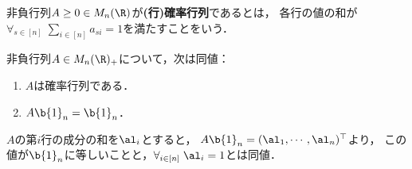 \documentclass[uplatex, dvipdfmx]{jsreport}
\begin{document}
\begin{definition}
    非負行列$A\ge0\in M_n(\R)$が\textbf{(行)確率行列}であるとは，
    各行の値の和が$\forall_{s\in[n]}\;\sum_{i\in[n]}a_{si}=1$を満たすことをいう．
\end{definition}

\begin{lemma}[行確率行列の特徴付け]
    非負行列$A\in M_n(\R)_+$について，次は同値：
    \begin{enumerate}
        \item $A$は確率行列である．
        \item $A\b{1}_n=\b{1}_n$．
    \end{enumerate}
\end{lemma}
\begin{Proof}
    $A$の第$i$行の成分の和を$\al_i$とすると，
    $A\b{1}_n=(\al_1,\cdots,\al_n)^\top$より，
    この値が$\b{1}_n$に等しいことと，$\forall_{i\in[n]}\;\al_i=1$とは同値．
\end{Proof}
\end{document}
